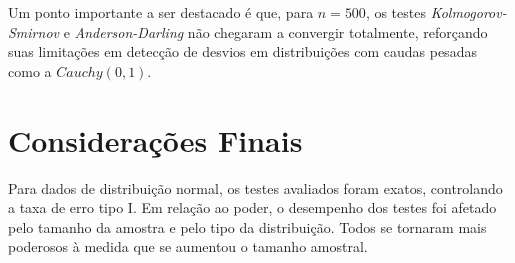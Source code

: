 \documentclass[a4paper,11pt]{article} %
\begin{document}
Um ponto importante a ser destacado é que, para $n = 500$, os testes \textit{Kolmogorov-Smirnov} e \textit{Anderson-Darling} não chegaram a convergir totalmente, reforçando suas limitações em detecção de desvios em distribuições com caudas pesadas como a $Cauchy(0, 1)$.




\section{Considerações Finais}

Para dados de distribuição normal, os testes avaliados foram exatos, controlando a taxa de erro tipo I. Em relação ao poder, o desempenho dos testes foi afetado pelo tamanho da amostra e pelo tipo da distribuição. Todos se tornaram mais poderosos à medida que se aumentou o tamanho amostral.
\end{document}

